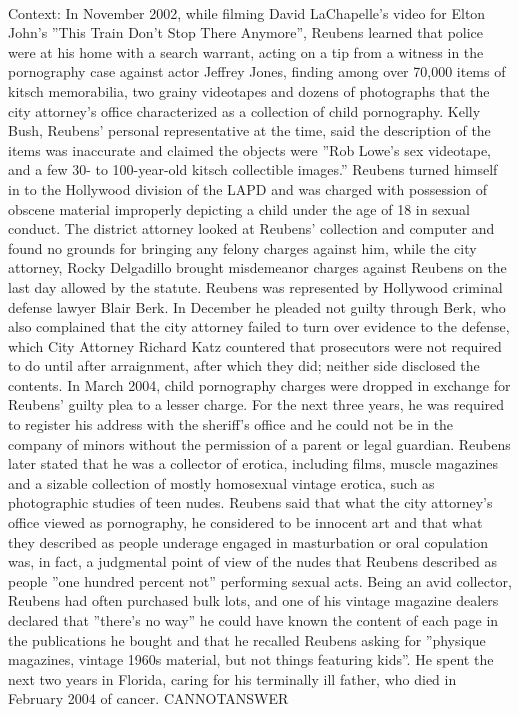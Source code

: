 \documentclass[11pt,a4paper, onecolumn]{article}
\begin{document}
\\ Context: In November 2002, while filming David LaChapelle's video for Elton John's ''This Train Don't Stop There Anymore'', Reubens learned that police were at his home with a search warrant, acting on a tip from a witness in the pornography case against actor Jeffrey Jones, finding among over 70,000 items of kitsch memorabilia, two grainy videotapes and dozens of photographs that the city attorney's office characterized as a collection of child pornography. Kelly Bush, Reubens' personal representative at the time, said the description of the items was inaccurate and claimed the objects were ''Rob Lowe's sex videotape, and a few 30- to 100-year-old kitsch collectible images.'' Reubens turned himself in to the Hollywood division of the LAPD and was charged with possession of obscene material improperly depicting a child under the age of 18 in sexual conduct. The district attorney looked at Reubens' collection and computer and found no grounds for bringing any felony charges against him, while the city attorney, Rocky Delgadillo brought misdemeanor charges against Reubens on the last day allowed by the statute. Reubens was represented by Hollywood criminal defense lawyer Blair Berk. In December he pleaded not guilty through Berk, who also complained that the city attorney failed to turn over evidence to the defense, which City Attorney Richard Katz countered that prosecutors were not required to do until after arraignment, after which they did; neither side disclosed the contents. In March 2004, child pornography charges were dropped in exchange for Reubens' guilty plea to a lesser charge. For the next three years, he was required to register his address with the sheriff's office and he could not be in the company of minors without the permission of a parent or legal guardian. Reubens later stated that he was a collector of erotica, including films, muscle magazines and a sizable collection of mostly homosexual vintage erotica, such as photographic studies of teen nudes. Reubens said that what the city attorney's office viewed as pornography, he considered to be innocent art and that what they described as people underage engaged in masturbation or oral copulation was, in fact, a judgmental point of view of the nudes that Reubens described as people ''one hundred percent not'' performing sexual acts. Being an avid collector, Reubens had often purchased bulk lots, and one of his vintage magazine dealers declared that ''there's no way'' he could have known the content of each page in the publications he bought and that he recalled Reubens asking for ''physique magazines, vintage 1960s material, but not things featuring kids''. He spent the next two years in Florida, caring for his terminally ill father, who died in February 2004 of cancer. CANNOTANSWER
\end{document}
